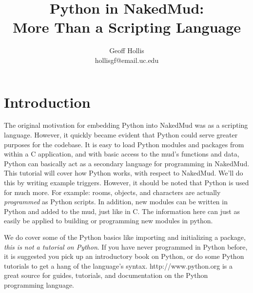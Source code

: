 \documentclass[12pt]{article}
\title{Python in NakedMud:\\
	   More Than a Scripting Language}
\author{Geoff Hollis\\
	    hollisgf@email.uc.edu}
\begin{document}



\maketitle
\newpage
\tableofcontents



\newpage \section{Introduction}
The original motivation for embedding Python into NakedMud was as a scripting language. However, it quickly became evident that Python could serve greater purposes for the codebase. It is easy to load Python modules and packages from within a C application, and with basic access to the mud's functions and data, Python can basically act as a secondary language for programming in NakedMud. This tutorial will cover how Python works, with respect to NakedMud. We'll do this by writing example triggers. However, it should be noted that Python is used for much more. For example: rooms, objects, and characters are actually {\it programmed} as Python scripts. In addition, new modules can be written in Python and added to the mud, just like in C. The information here can just as easily be applied to building or programming new modules in python.

We do cover some of the Python basics like importing and initializing a package, {\it this is not a tutorial on Python}. If you have never programmed in Python before, it is suggested you pick up an introductory book on Python, or do some Python tutorials to get a hang of the language's syntax. http://www.python.org is a great source for guides, tutorials, and documentation on the Python programming language.
\end{document}
